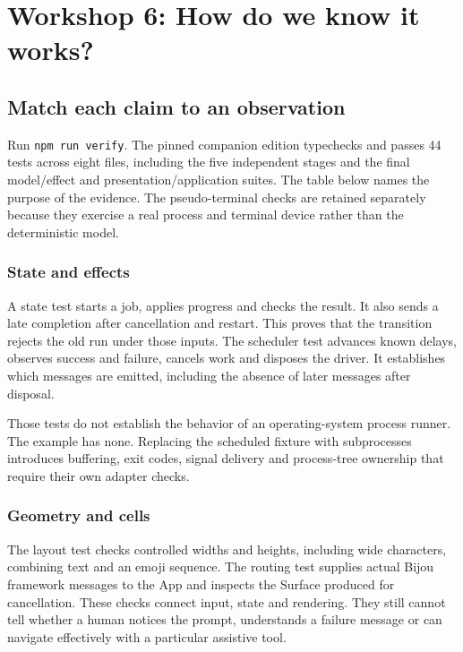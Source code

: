 \chapter{Workshop 6: How do we know it works?}\label{workshop-06}

\section{Match each claim to an observation}

Run \texttt{npm run verify}. The pinned companion edition typechecks and passes 44 tests across eight files, including the five independent stages and the final model/effect and presentation/application suites. The table below names the purpose of the evidence. The pseudo-terminal checks are retained separately because they exercise a real process and terminal device rather than the deterministic model.



\subsection{State and effects}

A state test starts a job, applies progress and checks the result. It also sends a late completion after cancellation and restart. This proves that the transition rejects the old run under those inputs. The scheduler test advances known delays, observes success and failure, cancels work and disposes the driver. It establishes which messages are emitted, including the absence of later messages after disposal.

Those tests do not establish the behavior of an operating-system process runner. The example has none. Replacing the scheduled fixture with subprocesses introduces buffering, exit codes, signal delivery and process-tree ownership that require their own adapter checks.

\subsection{Geometry and cells}

The layout test checks controlled widths and heights, including wide characters, combining text and an emoji sequence. The routing test supplies actual Bijou framework messages to the App and inspects the Surface produced for cancellation. These checks connect input, state and rendering. They still cannot tell whether a human notices the prompt, understands a failure message or can navigate effectively with a particular assistive tool.

